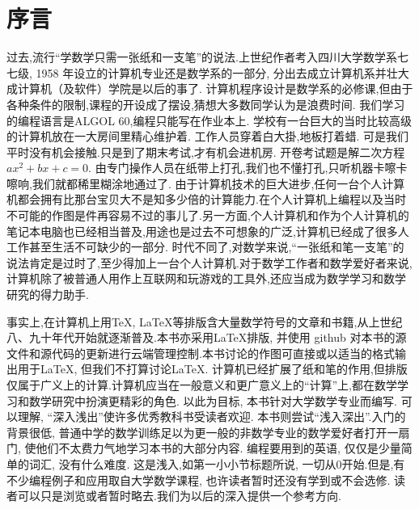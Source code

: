 \chapter*{序\quad 言}

\setcounter{page}{1}
\thispagestyle{empty}

过去,流行“学数学只需一张纸和一支笔”的说法.上世纪作者考入四川大学数学系七七级, 1958 年设立的计算机专业还是数学系的一部分,
分出去成立计算机系并壮大成计算机（及软件）学院是以后的事了.
计算机程序设计是数学系的必修课,但由于各种条件的限制,课程的开设成了摆设,猜想大多数同学认为是浪费时间.
我们学习的编程语言是ALGOL 60,编程只能写在作业本上.
学校有一台巨大的当时比较高级的计算机放在一大房间里精心维护着.
工作人员穿着白大掛,地板打着蜡.
可是我们平时没有机会接触.只是到了期末考试,才有机会进机房.
开卷考试题是解二次方程 $ax^2+bx+c = 0$.
由专门操作人员在纸带上打孔,我们也不懂打孔,只听机器卡嚓卡嚓响,我们就都稀里糊涂地通过了.
由于计算机技术的巨大进步,任何一台个人计算机都会拥有比那台宝贝大不是知多少倍的计算能力.在个人计算机上编程以及当时不可能的作图是件再容易不过的事儿了.另一方面,个人计算机和作为个人计算机的笔记本电脑也已经相当普及,用途也是过去不可想象的广泛,计算机已经成了很多人工作甚至生活不可缺少的一部分.
时代不同了,对数学来说,“一张纸和笔一支笔”的说法肯定是过时了,至少得加上一台个人计算机.对于数学工作者和数学爱好者来说,计算机除了被普通人用作上互联网和玩游戏的工具外,还应当成为数学学习和数学研究的得力助手.

事实上,在计算机上用\TeX,  \LaTeX 等排版含大量数学符号的文章和书籍,从上世纪八、九十年代开始就逐渐普及.本书亦采用\LaTeX 排版, 并使用 github 对本书的源文件和源代码的更新进行云端管理控制.本书讨论的作图可直接或以适当的格式输出用于\LaTeX, 但我们不打算讨论\LaTeX.
计算机已经扩展了纸和笔的作用,但排版仅属于广义上的计算.计算机应当在一般意义和更广意义上的“计算”上,都在数学学习和数学研究中扮演更精彩的角色.
以此为目标, 本书针对大学数学专业而编写.
可以理解, “深入浅出”使许多优秀教科书受读者欢迎. 
本书则尝试“浅入深出”.入门的背景很低,
普通中学的数学训练足以为更一般的非数学专业的数学爱好者打开一扇门, 使他们不太费力气地学习本书的大部分内容. 编程要用到的英语, 仅仅是少量简单的词汇, 没有什么难度.
这是浅入,如第一小小节标题所说, 一切从0开始.但是,有不少编程例子和应用取自大学数学课程, 也许读者暂时还没有学到或不会选修.
读者可以只是浏览或者暂时略去.我们为以后的深入提供一个参考方向.

